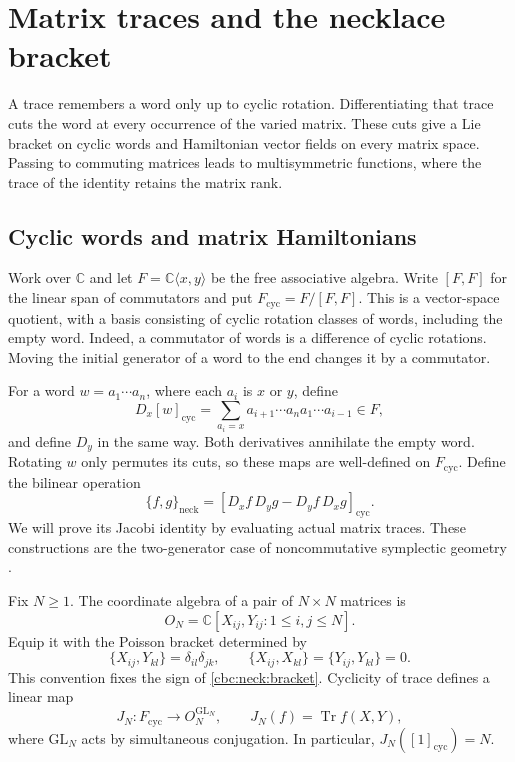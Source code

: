 \chapter{Matrix traces and the necklace bracket}\label{cbc:neck:main}
A trace remembers a word only up to cyclic rotation.  Differentiating that
trace cuts the word at every occurrence of the varied matrix.  These cuts
give a Lie bracket on cyclic words and Hamiltonian vector fields on every
matrix space.  Passing to commuting matrices leads to multisymmetric
functions, where the trace of the identity retains the matrix rank.

\section{Cyclic words and matrix Hamiltonians}
Work over $\mathbb C$ and let $F=\mathbb C\langle x,y\rangle$ be the free
associative algebra.  Write $[F,F]$ for the linear span of commutators and put
$F_{\mathrm{cyc}}=F/[F,F]$.  This is a vector-space quotient, with a basis
consisting of cyclic rotation classes of words, including the empty word.
Indeed, a commutator of words is a difference of cyclic rotations.  Moving
the initial generator of a word to the end changes it by a commutator.

For a word $w=a_1\cdots a_n$, where each $a_i$ is $x$ or $y$, define
\begin{equation}\label{cbc:neck:derivative}
 D_x[w]_{\mathrm{cyc}}
 =\sum_{a_i=x}a_{i+1}\cdots a_na_1\cdots a_{i-1}\in F,
\end{equation}
and define $D_y$ in the same way.  Both derivatives annihilate the empty
word.  Rotating $w$ only permutes its cuts, so these maps are well-defined
on $F_{\mathrm{cyc}}$.  Define the bilinear operation
\begin{equation}\label{cbc:neck:bracket}
 \{f,g\}_{\mathrm{neck}}
 =[D_xf\,D_yg-D_yf\,D_xg]_{\mathrm{cyc}}.
\end{equation}
We will prove its Jacobi identity by evaluating actual matrix traces.  These
constructions are the two-generator case of noncommutative symplectic
geometry \cite[\S\S6.2,8.4]{CBEGNecklace}.

Fix $N\geq1$.  The coordinate algebra of a pair of $N\times N$ matrices is
\[
 O_N=\mathbb C[X_{ij},Y_{ij}:1\leq i,j\leq N].
\]
Equip it with the Poisson bracket determined by
\[
 \{X_{ij},Y_{kl}\}=\delta_{il}\delta_{jk},\qquad
 \{X_{ij},X_{kl}\}=\{Y_{ij},Y_{kl}\}=0.
\]
This convention fixes the sign of \eqref{cbc:neck:bracket}.  Cyclicity of
trace defines a linear map
\[
 J_N:F_{\mathrm{cyc}}\longrightarrow O_N^{\mathrm{GL}_N},
 \qquad J_N(f)=\operatorname{Tr}f(X,Y),
\]
where $\mathrm{GL}_N$ acts by simultaneous conjugation.  In particular,
$J_N([1]_{\mathrm{cyc}})=N$.

